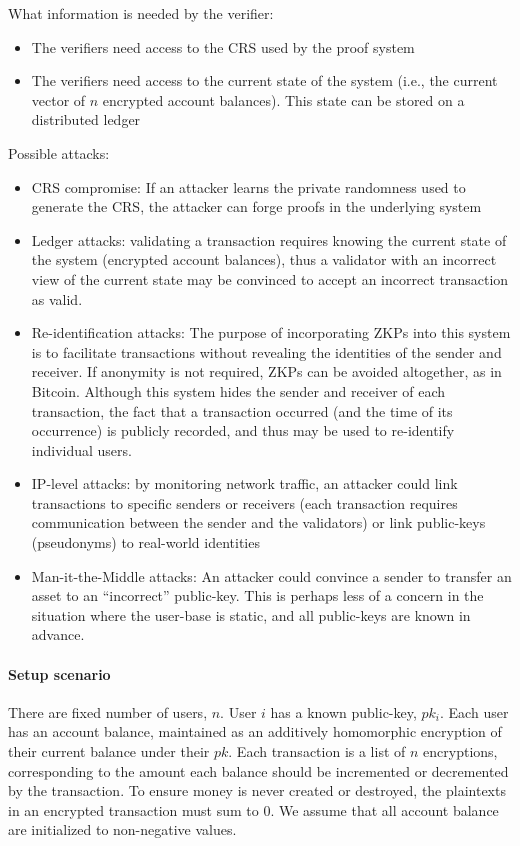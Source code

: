 What information is needed by the verifier:
\begin{itemize}
    \item The verifiers need access  to the CRS used by the proof system
    \item The verifiers need access to the current state of the system (i.e., the current vector of $n$ encrypted account balances).  
		This state can be stored on a distributed ledger
\end{itemize}

Possible attacks:
	\begin{itemize}
    \item CRS compromise: If an attacker learns the private randomness used to generate the CRS, the attacker can forge proofs in the underlying system
    \item Ledger attacks: validating a transaction requires knowing the current state of the system (encrypted account balances), thus a validator with an incorrect view of the current state may be convinced to accept an incorrect transaction as valid.
    \item Re-identification attacks: The purpose of incorporating ZKPs into this system is to facilitate transactions without revealing the identities of the sender and receiver.  If anonymity is not required, ZKPs can be avoided altogether, as in Bitcoin.  Although this system hides the sender and receiver of each transaction, the fact that a transaction occurred (and the time of its occurrence) is publicly recorded, and thus may be used to re-identify individual users.
    \item IP-level attacks: by monitoring network traffic, an attacker could link transactions to specific senders or receivers (each transaction requires communication between the sender and the validators) or link public-keys (pseudonyms) to real-world identities
    \item Man-it-the-Middle attacks: An attacker could convince a sender to transfer an asset to an ``incorrect'' public-key.  This is perhaps less of a concern in the situation where the user-base is static, and all public-keys are known in advance.
	\end{itemize}

\paragraph[:]{Setup scenario} 
There are fixed number of users, $n$.  
User $i$ has a known public-key, $pk_i$.
Each user has an account balance, maintained as an additively homomorphic encryption of their current balance under their $pk$.
Each transaction is a list of $n$ encryptions, corresponding to the amount each balance should be incremented or decremented by the transaction.
To ensure money is never created or destroyed, the plaintexts in an encrypted transaction must sum to 0.
We assume that all account balance are initialized to non-negative values.

